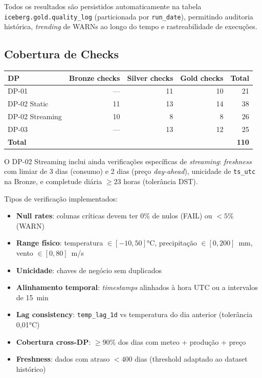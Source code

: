 \documentclass[11pt,a4paper]{article}
\begin{document}
Todos os resultados são persistidos automaticamente na tabela \texttt{iceberg.gold.quality\_log} (particionada por \texttt{run\_date}), permitindo auditoria histórica, \textit{trending} de WARNs ao longo do tempo e rastreabilidade de execuções.

\subsection{Cobertura de Checks}

\begin{table}[h!]
\centering
\begin{tabular}{lrrrr}
\toprule
\textbf{DP} & \textbf{Bronze checks} & \textbf{Silver checks} & \textbf{Gold checks} & \textbf{Total} \\
\midrule
DP-01 & --- & 11 & 10 & 21 \\
DP-02 Static & 11 & 13 & 14 & 38 \\
DP-02 Streaming & 10 & 8 & 8 & 26 \\
DP-03 & --- & 13 & 12 & 25 \\
\midrule
\textbf{Total} & & & & \textbf{110} \\
\bottomrule
\end{tabular}
\end{table}

O DP-02 Streaming inclui ainda verificações específicas de \textit{streaming}: \textit{freshness} com limiar de 3 dias (consumo) e 2 dias (preço \textit{day-ahead}), unicidade de \texttt{ts\_utc} na Bronze, e completude diária $\geq 23$ horas (tolerância DST).

Tipos de verificação implementados:

\begin{itemize}[leftmargin=*,noitemsep]
  \item \textbf{Null rates}: colunas críticas devem ter 0\% de nulos (FAIL) ou $<5$\% (WARN)
  \item \textbf{Range físico}: temperatura $\in [-10, 50]$°C, precipitação $\in [0, 200]$~mm, vento $\in [0, 80]$~m/s
  \item \textbf{Unicidade}: chaves de negócio sem duplicados
  \item \textbf{Alinhamento temporal}: \textit{timestamps} alinhados à hora UTC ou a intervalos de 15~min
  \item \textbf{Lag consistency}: \texttt{temp\_lag\_1d} vs temperatura do dia anterior (tolerância 0,01°C)
  \item \textbf{Cobertura cross-DP}: $\geq 90$\% dos dias com meteo + produção + preço
  \item \textbf{Freshness}: dados com atraso $< 400$ dias (threshold adaptado ao dataset histórico)
\end{itemize}
\end{document}

